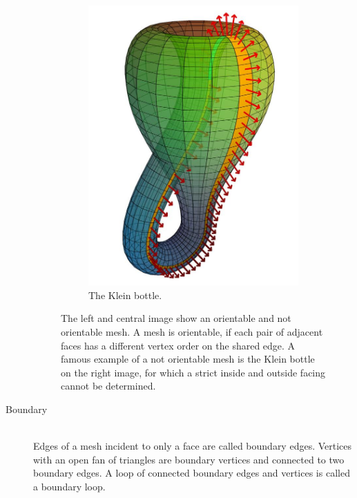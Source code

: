 \begin{description}
\begin{figure}[H]
\begin{subfigure}[b]{0.3\textwidth}
			\includegraphics[width=\textwidth]{images/klein_bottle}
			\caption{The Klein bottle.}
			\label{fig:klein_bottle}
		\end{subfigure}
		\caption{
			The left and central image show an orientable and not orientable mesh.
			A mesh is orientable, if each pair of adjacent faces has a different vertex order on the shared edge.
			A famous example of a not orientable mesh is the Klein bottle on the right image, for which a strict inside and outside facing cannot be determined.
		}
		\label{fig:orientable_mesh}
	\end{figure}


	\item[Boundary] \hfill \\
	Edges of a mesh incident to only a face are called boundary edges.
	Vertices with an open fan of triangles are boundary vertices and connected to two boundary edges.
	A loop of connected boundary edges and vertices is called a boundary loop.



\end{description}
